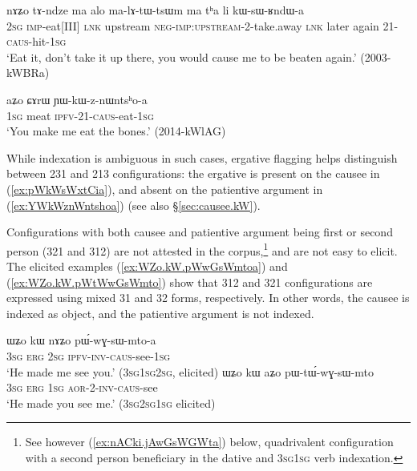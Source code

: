 \begin{exe}
	\ex \label{ex:kWsWRndWa}
	\gll  nɤʑo tɤ-ndze ma alo ma-lɤ-tɯ-tsɯm ma tʰa li kɯ-sɯ-ʁndɯ-a \\
	\textsc{2sg} \textsc{imp}-eat[III] \textsc{lnk} upstream \textsc{neg}-\textsc{imp}:\textsc{upstream}-2-take.away \textsc{lnk} later again 2\fl{}1-\textsc{caus}-hit-\textsc{1sg} \\
	\glt  `Eat it, don't take it up there, you would cause me to be beaten again.' (2003-kWBRa)
\end{exe}

\begin{exe}
	\ex \label{ex:YWkWznWntshoa}
	\gll aʑo ɕɤrɯ ɲɯ-kɯ-z-nɯntsʰo-a \\
	\textsc{1sg} meat \textsc{ipfv}-2\fl{}1-\textsc{caus}-eat-\textsc{1sg} \\
	\glt `You make me eat the bones.' (2014-kWlAG)
\end{exe}

While indexation is ambiguous in such cases, ergative flagging helps distinguish between 2\fl{}3\fl{}1  and 2\fl{}1\fl{}3 configurations: the ergative is present on the causee in (\ref{ex:pWkWsWxtCia}), and absent on the patientive argument in (\ref{ex:YWkWznWntshoa}) (see also §\ref{sec:causee.kW}).

Configurations with both causee and patientive argument being first or second person (3\fl{}2\fl{}1 and 3\fl{}1\fl{}2) are not attested in the corpus,\footnote{See however (\ref{ex:nACki.jAwGsWGWta}) below, quadrivalent configuration with a second person beneficiary in the dative and 3\textsc{sg}\fl{}1\textsc{sg} verb indexation.} and are not easy to elicit. The elicited examples (\ref{ex:WZo.kW.pWwGsWmtoa}) and (\ref{ex:WZo.kW.pWtWwGsWmto}) show that 3\fl{}1\fl{}2 and 3\fl{}2\fl{}1 configurations are expressed using mixed 3\fl{}1 and 3\fl{}2 forms, respectively. In other words, the causee is indexed as object, and the patientive argument is not indexed.

\begin{exe}
	\ex 
	\begin{xlist}
		\ex \label{ex:WZo.kW.pWwGsWmtoa}
		\gll ɯʑo kɯ nɤʑo pɯ́-wɣ-sɯ-mto-a \\
		\textsc{3sg} \textsc{erg} \textsc{2sg} \textsc{ipfv}-\textsc{inv}-\textsc{caus}-see-\textsc{1sg} \\
		\glt `He made me see you.' (3\textsc{sg}\fl{}1\textsc{sg}\fl{}2\textsc{sg}, elicited)
		\ex \label{ex:WZo.kW.pWtWwGsWmto}
		\gll ɯʑo kɯ aʑo pɯ-tɯ́-wɣ-sɯ-mto \\
		\textsc{3sg} \textsc{erg} \textsc{1sg} \textsc{aor}-2-\textsc{inv}-\textsc{caus}-see \\
		\glt `He made you see me.'  (3\textsc{sg}\fl{}2\textsc{sg}\fl{}1\textsc{sg} elicited)
	\end{xlist}
\end{exe}

